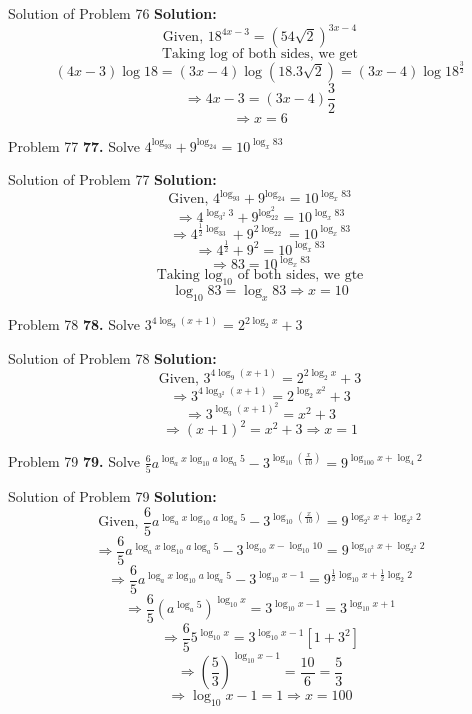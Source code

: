 \documentclass[aspectratio=1610,8pt]{beamer}
\begin{document}
\begin{frame}{Solution of Problem 76}
  \textbf{Solution:} $$\text{Given,~}18^{4x - 3} = (54\sqrt{2})^{3x - 4}$$
  $$\text{Taking~}\log\text{~of both sides, we get}$$
  $$(4x - 3)\log 18 = (3x - 4)\log(18.3\sqrt{2}) = (3x - 4)\log18^{\frac{3}{2}}$$
  $$\Rightarrow 4x - 3 = (3x - 4)\frac{3}{2}$$
  $$\Rightarrow x = 6$$
\end{frame}
\begin{frame}{Problem 77}
  \textbf{77.} Solve $4^{\log_93} + 9^{\log_24} = 10^{\log_x83}$
\end{frame}
\begin{frame}{Solution of Problem 77}
  \textbf{Solution:} $$\text{Given,~}4^{\log_93} + 9^{\log_24} = 10^{\log_x83}$$
  $$\Rightarrow 4^{\log_{3^2}3} + 9^{\log_22^2} = 10^{\log_x83}$$
  $$\Rightarrow 4^{\frac{1}{2}\log_33} + 9^{2\log_22} = 10^{\log_x83}$$
  $$\Rightarrow 4^{\frac{1}{2}} + 9^2 = 10^{\log_x83}$$
  $$\Rightarrow 83 = 10^{\log_x83}$$
  $$\text{Taking~}\log_{10}\text{~of both sides, we gte}$$
  $$\log_{10}83 = \log_x83 \Rightarrow x = 10$$
\end{frame}
\begin{frame}{Problem 78}
  \textbf{78.} Solve $3^{4\log_9(x + 1)} = 2^{2\log_2x} + 3$
\end{frame}
\begin{frame}{Solution of Problem 78}
  \textbf{Solution:} $$\text{Given,~}3^{4\log_9(x + 1)} = 2^{2\log_2x} + 3$$
  $$\Rightarrow 3^{4\log_{3^2}(x + 1)} = 2^{\log_2x^2} + 3$$
  $$\Rightarrow 3^{\log_3(x + 1)^2} = x^2 + 3$$
  $$\Rightarrow (x + 1)^2 = x^2 + 3 \Rightarrow x = 1$$
\end{frame}
\begin{frame}{Problem 79}
  \textbf{79.} Solve $\frac{6}{5}a^{\log_ax\log_{10}a\log_a5} - 3^{\log_{10}\left(\frac{x}{10}\right)} = 9^{\log_{100}x + \log_{4}2}$
\end{frame}
\begin{frame}{Solution of Problem 79}
  \textbf{Solution:} $$\text{Given,~}\frac{6}{5}a^{\log_ax\log_{10}a\log_a5} - 3^{\log_{10}\left(\frac{x}{10}\right)} = 9^{\log_{2^2}x + \log_{2^2}2}$$
  $$\Rightarrow \frac{6}{5}a^{\log_ax\log_{10}a\log_a5} - 3^{\log_{10}x - \log_{10}10} = 9^{\log_{10^2}x + \log_{2^2}2}$$
  $$\Rightarrow \frac{6}{5}a^{\log_ax\log_{10}a\log_a5} - 3^{\log_{10}x - 1} = 9^{\frac{1}{2}\log_{10}x + \frac{1}{2}\log_{2}2}$$
  $$\Rightarrow \frac{6}{5}(a^{\log_a5})^{\log_{10}x} = 3^{\log_{10}x - 1} = 3^{\log_{10}x + 1}$$
  $$\Rightarrow \frac{6}{5}5^{\log_{10}x} = 3^{\log_{10}x - 1}[1 + 3^2]$$
  $$\Rightarrow \left(\frac{5}{3}\right)^{\log_{10}x - 1} = \frac{10}{6} = \frac{5}{3}$$
  $$\Rightarrow \log_{10}x - 1 = 1 \Rightarrow x = 100$$
\end{frame}
\end{document}
